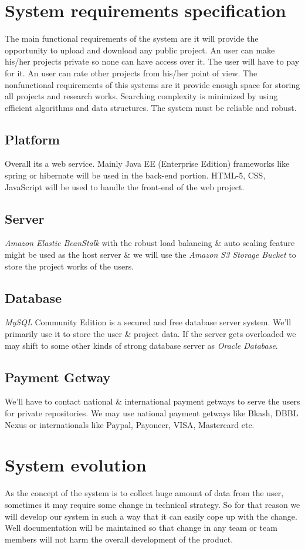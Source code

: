 \documentclass{scrreprt}
\begin{document}
\chapter{System requirements specification}
The main functional requirements of the system are it will provide the opportunity to upload and download any public project. An user can make his/her projects private so none can have access over it. The user will have to pay for it. An user can rate other projects from his/her point of view. The nonfunctional requirements of this systems are it provide enough space for storing all projects and research works. Searching complexity is minimized by using efficient algorithms and data structures. The system must be reliable and robust.
\section{Platform}
Overall its a web service. Mainly Java EE (Enterprise Edition) frameworks like spring or hibernate will be used in the back-end portion. HTML-5, CSS, JavaScript will be used to handle the front-end of the web project.
\section{Server}
\emph{Amazon Elastic BeanStalk} with the robust load balancing \& auto scaling feature might be used as the host server \& we will use the \emph{Amazon S3 Storage Bucket} to store the project works of the users.
\section{Database}
\emph{MySQL} Community Edition is a secured and free database server system. We'll primarily use it to store the user \& project data. If the server gets overloaded we may shift to some other kinds of strong database server as \emph{Oracle Database}.
\section{Payment Getway}
We'll have to contact national \& international payment getways to serve the users for private repositories. We may use national payment getways like Bkash, DBBL Nexus or internationals like Paypal, Payoneer, VISA, Mastercard etc.

\chapter{System evolution}
As the concept of the system is to collect huge amount of data from the user, sometimes it may require some change in technical strategy. So for that reason we will develop our system in such a way that it can easily cope up with the change. Well documentation will be maintained so that change in any team or team members will not harm the overall development of the product.
\end{document}
